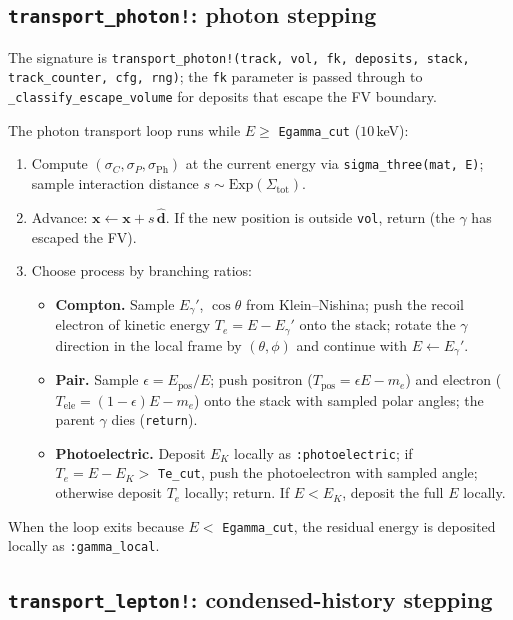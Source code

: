 \documentclass[11pt]{article}
\begin{document}
\subsection{\texttt{transport\_photon!}: photon stepping}
\label{sec:fullstack-photon}

The signature is \texttt{transport\_photon!(track, vol, fk, deposits,
stack, track\_counter, cfg, rng)}; the \texttt{fk} parameter is passed
through to \texttt{\_classify\_escape\_volume} for deposits that escape
the FV boundary.

The photon transport loop runs while $E \geq$ \texttt{Egamma\_cut} ($10$\,keV):

\begin{enumerate}[label=\arabic*.]
\item Compute $(\sigma_C, \sigma_P, \sigma_{\mathrm{Ph}})$ at the current
energy via \texttt{sigma\_three(mat, E)}; sample interaction distance
$s \sim \mathrm{Exp}(\Sigma_{\mathrm{tot}})$.
\item Advance: $\mathbf{x} \leftarrow \mathbf{x} + s\,\hat{\mathbf{d}}$. If the
new position is outside \texttt{vol}, return (the $\gamma$ has escaped the FV).
\item Choose process by branching ratios:
\begin{itemize}
\item \textbf{Compton.} Sample $E_\gamma'$, $\cos\theta$ from Klein--Nishina;
push the recoil electron of kinetic energy $T_e = E - E_\gamma'$ onto the
stack; rotate the $\gamma$ direction in the local frame by
$(\theta, \phi)$ and continue with $E \leftarrow E_\gamma'$.
\item \textbf{Pair.} Sample $\epsilon = E_{\mathrm{pos}}/E$; push positron
($T_{\mathrm{pos}} = \epsilon E - m_e$) and electron
($T_{\mathrm{ele}} = (1 - \epsilon) E - m_e$) onto the stack with sampled
polar angles; the parent $\gamma$ dies (\texttt{return}).
\item \textbf{Photoelectric.} Deposit $E_K$ locally as
\texttt{:photoelectric}; if $T_e = E - E_K > $ \texttt{Te\_cut}, push the
photoelectron with sampled angle; otherwise deposit $T_e$ locally; return.
If $E < E_K$, deposit the full $E$ locally.
\end{itemize}
\end{enumerate}

When the loop exits because $E < $ \texttt{Egamma\_cut}, the residual
energy is deposited locally as \texttt{:gamma\_local}.

\subsection{\texttt{transport\_lepton!}: condensed-history stepping}
\label{sec:fullstack-lepton}
\end{document}
